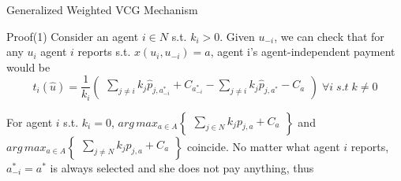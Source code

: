 \begin{frame}{Generalized Weighted VCG Mechanism}
\begin{block}{Proof(1)}
Consider an agent $i \in N$ s.t. $k_{i} > 0$. Given $u_{-i}$, we can check that for any $u_{i}$ agent $i$ reports s.t. $x(u_{i},u_{-i})=a$, agent i’s agent-independent payment would be
$$t_{i}(\hat{u}) = \frac{1}{k_{i}}\begin{pmatrix}
\sum _{j \neq i}k_{j}\hat{p}_{j,a_{-i}^{*}} + C_{a_{-i}^{*}} - \sum _{j \neq i}k_{j}\hat{p}_{j,a^{*}} - C_{a}
\end{pmatrix} \; \forall i\; s.t \; k \neq 0$$

For agent $i$ s.t. $k_{i} = 0$, $arg \,max_{a \in A}\begin{Bmatrix}
\sum _{j \in N} k_{j}p_{j,a} + C_{a}
\end{Bmatrix}$ and $arg \,max_{a \in A}\begin{Bmatrix}
\sum _{j \neq N} k_{j}p_{j,a} + C_{a}
\end{Bmatrix}$ coincide. No matter what agent $i$ reports, $a^{*}_{-i} = a^{*}$ is always selected and she does not pay anything, thus
\end{block}
\end{frame}
